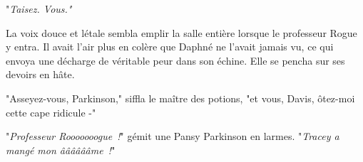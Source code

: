 "\emph{Taisez. Vous."}

La voix douce et létale sembla emplir la salle entière lorsque le professeur Rogue y entra. Il avait l'air plus en colère que Daphné ne l'avait jamais vu, ce qui envoya une décharge de véritable peur dans son échine. Elle se pencha sur ses devoirs en hâte.

"Asseyez-vous, Parkinson," siffla le maître des potions, "et vous, Davis, ôtez-moi cette cape ridicule -"

"\emph{Professeur Rooooooogue~!}" gémit une Pansy Parkinson en larmes. "\emph{Tracey a mangé mon ââââââme~!}" 

